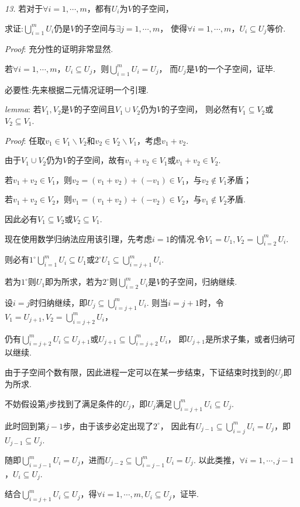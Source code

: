 \textit{13.}
若对于$\forall i=1,\cdots,m$，都有$U_i$为$V$的子空间，

求证:$\bigcup_{i=1}^m U_i$仍是$V$的子空间与$\exists j=1,\cdots,m$，
使得$\forall i=1,\cdots,m$，$U_i \subseteq U_j$等价.

\textit{Proof}:
充分性的证明非常显然.

若$\forall i=1,\cdots,m$，$U_i \subseteq U_j$，则$\bigcup_{i=1}^m U_i=U_j$，
而$U_j$是$V$的一个子空间，证毕.

必要性:先来根据二元情况证明一个引理.

\textit{lemma}:
若$V_1,V_2$是$V$的子空间且$V_1 \cup V_2$仍为$V$的子空间，
则必然有$V_1 \subseteq V_2$或$V_2 \subseteq V_1$.

\textit{Proof}:
任取$v_1 \in V_1 \backslash V_2$和$v_2 \in V_2 \backslash V_1$，考虑$v_1+v_2$.

由于$V_1 \cup V_2$仍为$V$的子空间，故有$v_1+v_2 \in V_1$或$v_1+v_2 \in V_2$.

若$v_1+v_2 \in V_1$，则$v_2=(v_1+v_2)+(-v_1) \in V_1$，与$v_2 \notin V_1$矛盾；

若$v_1+v_2 \in V_2$，则$v_1=(v_1+v_2)+(-v_2) \in V_2$，与$v_1 \notin V_2$矛盾.

因此必有$V_1 \subseteq V_2$或$V_2 \subseteq V_1$.

现在使用数学归纳法应用该引理，先考虑$i=1$的情况.令$V_1=U_1,V_2=\bigcup_{i=2}^m U_i$.

则必有$1^{\circ}\bigcup_{i=1}^m U_i \subseteq U_1$或$2^{\circ}U_1 \subseteq \bigcup_{i=j+1}^m U_i$.

若为$1^{\circ}$则$U_1$即为所求，若为$2^{\circ}$则$\bigcup_{i=2}^m U_i$是$V$的子空间，归纳继续.

设$i=j$时归纳继续，即$U_j \subseteq \bigcup_{i=j+1}^m U_i$.
则当$i=j+1$时，令$V_1=U_{j+1},V_2=\bigcup_{i=j+2}^m U_i$，

仍有$\bigcup_{i=j+2}^m U_i \subseteq U_{j+1}$或$U_{j+1} \subseteq \bigcup_{i=j+2}^m U_i$，
即$U_{j+1}$是所求子集，或者归纳可以继续.

由于子空间个数有限，因此进程一定可以在某一步结束，下证结束时找到的$U_j$即为所求.

不妨假设第$j$步找到了满足条件的$U_j$，即$U_j$满足$\bigcup_{i=j+1}^m U_i\subseteq U_j$.

此时回到第$j-1$步，由于该步必定出现了$2^{\circ}$，
因此有$U_{j-1} \subseteq \bigcup_{i=j}^m U_i=U_j$，即$U_{j-1} \subseteq U_j$.

随即$\bigcup_{i=j-1}^m U_i=U_j$，进而$U_{j-2} \subseteq \bigcup_{i=j-1}^m U_i=U_j$.
以此类推，$\forall i=1,\cdots,j-1$，$U_i\subseteq U_j$.

结合$\bigcup_{i=j+1}^m U_i \subseteq U_j$，得$\forall i=1,\cdots,m,U_i \subseteq U_j$，证毕.

